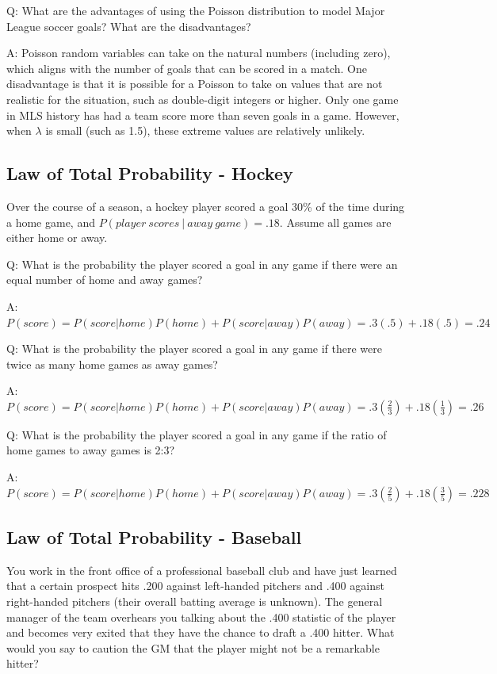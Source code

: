 \documentclass[
  11pt,
]{book}
\theoremstyle{definition}
\theoremstyle{definition}
\theoremstyle{definition}
\theoremstyle{definition}
\theoremstyle{remark}
\begin{document}
Q: What are the advantages of using the Poisson distribution to model Major League soccer goals? What are the disadvantages?

A: Poisson random variables can take on the natural numbers (including zero), which aligns with the number of goals that can be scored in a match. One disadvantage is that it is possible for a Poisson to take on values that are not realistic for the situation, such as double-digit integers or higher. Only one game in MLS history has had a team score more than seven goals in a game. However, when \(\lambda\) is small (such as 1.5), these extreme values are relatively unlikely.

\hypertarget{law-of-total-probability---hockey}{%
\subsection{Law of Total Probability - Hockey}\label{law-of-total-probability---hockey}}

Over the course of a season, a hockey player scored a goal 30\% of the time during a home game, and \(P(player\ scores\ |\ away\ game) = .18\). Assume all games are either home or away.

Q: What is the probability the player scored a goal in any game if there were an equal number of home and away games?

A: \(P(score) = P(score|home)P(home) + P(score|away)P(away) = .3(.5) + .18(.5) = .24\)

Q: What is the probability the player scored a goal in any game if there were twice as many home games as away games?

A: \(P(score) = P(score|home)P(home) + P(score|away)P(away) = .3(\frac{2}{3}) + .18(\frac{1}{3}) = .26\)

Q: What is the probability the player scored a goal in any game if the ratio of home games to away games is 2:3?

A: \(P(score) = P(score|home)P(home) + P(score|away)P(away) = .3(\frac{2}{5}) + .18(\frac{3}{5}) = .228\)

\hypertarget{law-of-total-probability---baseball}{%
\subsection{Law of Total Probability - Baseball}\label{law-of-total-probability---baseball}}

You work in the front office of a professional baseball club and have just learned that a certain prospect hits .200 against left-handed pitchers and .400 against right-handed pitchers (their overall batting average is unknown). The general manager of the team overhears you talking about the .400 statistic of the player and becomes very exited that they have the chance to draft a .400 hitter. What would you say to caution the GM that the player might not be a remarkable hitter?
\end{document}
